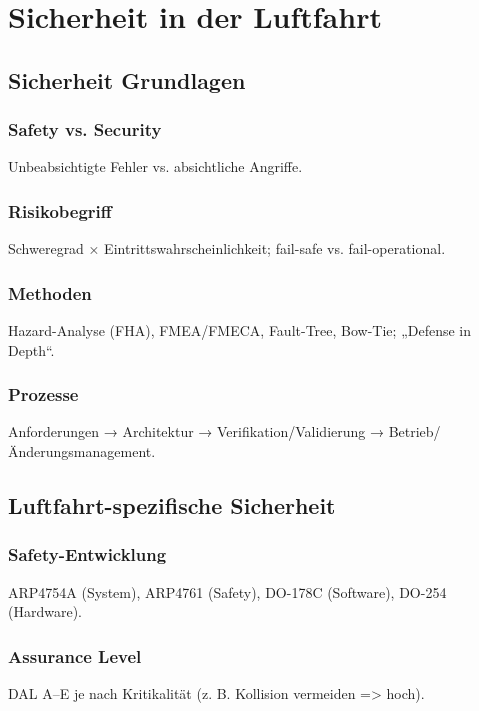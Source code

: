 \part{Sicherheit in der Luftfahrt}
\chapter{Sicherheit Grundlagen} 

\section{Safety vs. Security}
Unbeabsichtigte Fehler vs. absichtliche Angriffe.

\section{Risikobegriff}
Schweregrad × Eintrittswahrscheinlichkeit; fail-safe vs. fail-operational.

\section{Methoden}
Hazard-Analyse (FHA), FMEA/FMECA, Fault-Tree, Bow-Tie; „Defense in Depth“.

\section{Prozesse}
Anforderungen → Architektur → Verifikation/Validierung → Betrieb/Änderungsmanagement.



\chapter{Luftfahrt-spezifische Sicherheit} 

\section{Safety-Entwicklung}
ARP4754A (System), ARP4761 (Safety), DO-178C (Software), DO-254 (Hardware).

\section{Assurance Level}
DAL A–E je nach Kritikalität (z. B. Kollision vermeiden => hoch).

